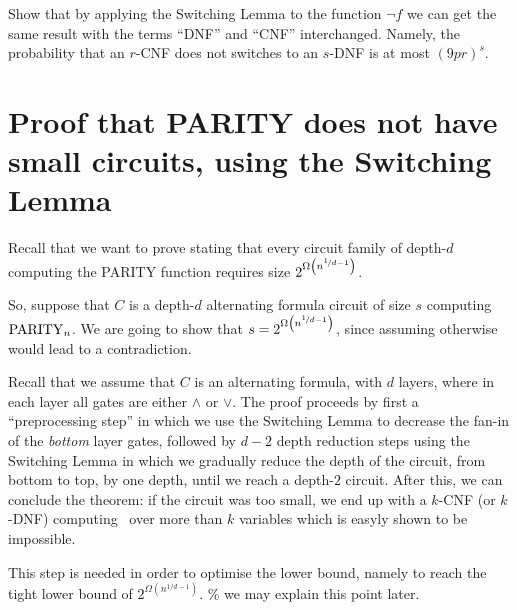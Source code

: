 \begin{exercise} Show that by applying the Switching Lemma to the function $\neg f$ we can get the same result with the terms ``DNF'' and ``CNF'' interchanged. Namely, the probability that an $r$-CNF does not switches to an $s$-DNF is at most $(9pr)^s$.
\end{exercise}

\section{Proof that PARITY does not have small circuits, using the Switching Lemma}

Recall that we want to prove   stating that every circuit family of depth-$d$ computing the PARITY function requires size $2^{\Omega\left(n^{\nicefrac{1}{d-1}}\right)}$.

So, suppose  that $C$ is a depth-$d$ alternating formula circuit of size $s$ computing $\operatorname{PARITY}_n$. We are going to show that $s= 2^{\Omega\left(n^{\nicefrac{1}{d-1}}\right)}$, since assuming otherwise would lead to a contradiction.


Recall that we assume that $C$ is an alternating formula, with $d$ layers, where in each layer all gates are either $\land$ or $\lor$.  The proof proceeds by first a ``preprocessing step'' in which we use the Switching Lemma to decrease the fan-in of the \emph{bottom} layer gates, followed by   $d-2$ depth reduction steps using the Switching Lemma in which we gradually reduce the depth of the circuit, from bottom to top, by one depth, until we reach a depth-$2$ circuit.
After this, we can conclude the theorem: if the circuit was too small, we end up with a $k$-CNF (or $k$-DNF) computing \Parity\ over more than $k$ variables which is easyly shown to be impossible.








This step is needed in order to optimise the lower bound, namely to reach the tight lower bound of $2^{\Omega(n^{1/d-1})}$. \% we may explain this point later.

